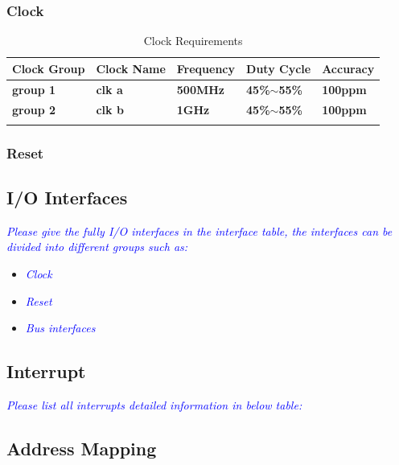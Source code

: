 \subsubsection{Clock}
\begin{table}[hp]
    \centering
    \begin{tabular}{|l|l|l|l|l|}
    \hline
    \rowcolor[HTML]{009901} 
    {\color[HTML]{343434} \textbf{Clock Group}} & {\color[HTML]{343434} \textbf{Clock Name}} & {\color[HTML]{343434} \textbf{Frequency}} & {\color[HTML]{343434} \textbf{Duty Cycle}}     & {\color[HTML]{343434} \textbf{Accuracy}} \\ \hline
    {\color[HTML]{329A9D} \textbf{group 1}}     & {\color[HTML]{329A9D} \textbf{clk a}}      & {\color[HTML]{329A9D} \textbf{500MHz}}    & {\color[HTML]{329A9D} \textbf{45\%$\sim$55\%}} & {\color[HTML]{329A9D} \textbf{100ppm}}   \\ \hline
    {\color[HTML]{329A9D} \textbf{group 2}}     & {\color[HTML]{329A9D} \textbf{clk b}}      & {\color[HTML]{329A9D} \textbf{1GHz}}      & {\color[HTML]{329A9D} \textbf{45\%$\sim$55\%}} & {\color[HTML]{329A9D} \textbf{100ppm}}   \\ \hline
    {\color[HTML]{329A9D} \textbf{}}            & {\color[HTML]{329A9D} \textbf{}}           & {\color[HTML]{329A9D} \textbf{}}          & {\color[HTML]{329A9D} \textbf{}}               & {\color[HTML]{329A9D} \textbf{}}         \\ \hline
    \end{tabular}
    \caption{Clock Requirements}
    \end{table}

\subsubsection{Reset}

\subsection{I/O Interfaces}

\noindent\textit{\small\textcolor{blue}{Please give the fully I/O interfaces in the interface table, the interfaces can be divided into different groups such as:}}
\begin{itemize}
    \item \noindent\textit{\small\textcolor{blue}{Clock}}
    \item \noindent\textit{\small\textcolor{blue}{Reset}}
    \item \noindent\textit{\small\textcolor{blue}{Bus interfaces}}
\end{itemize}

\subsection{Interrupt}
\noindent\textit{\small\textcolor{blue}{Please list all interrupts detailed information in below table:}}

\subsection{Address Mapping}

